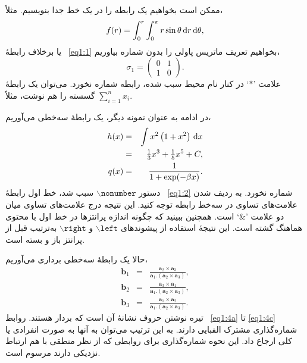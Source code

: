 ممکن است بخواهیم یک رابطه را در یک خط جدا بنویسیم. مثلاً،
\begin{equation}\label{eq1:1}
f(r) = \int_0^r \int_0^\pi r\sin\theta \d r \d\theta,
\end{equation}
یا برخلاف رابطهٔ~
\eqref{eq1:1} 
بخواهیم تعریف ماتریس پاولی را بدون شماره بیاوریم،
\begin{equation*}
\sigma_1 = \left(\begin{array}{ll}
0 & 1\\
1 & 0
\end{array}\right).
\end{equation*}
علامت '$*$` در کنار نام محیط 
سبب شده، رابطه شماره نخورد. می‌توان یک رابطهٔ گسسته را هم نوشت، مثلاً 
$\sum_{i=1}^{n}x_i$.

در ادامه به عنوان نمونه دیگر، یک رابطهٔ سه‌خطی می‌آوریم،
\begin{eqnarray}\label{eq1:2}
h(x) &=& \int x^2\left(1+x^2\right) \d x\nonumber\\
&=& \tfrac{1}{3} x^3 + \tfrac{1}{5} x^5 + C,\\
q(x) &=& \frac{1}{1+\exp(-\beta x)}.\label{eq1:3}
\end{eqnarray}
دستور  
$\backslash\texttt{nonumber}$ 
سبب شد، خط اول رابطهٔ~%
\eqref{eq1:2} 
شماره نخورد. به ردیف شدن علامت‌های تساوی در سه‌خط رابطه توجه کنید. این نتیجه درج علامت‌های تساوی میان دو علامت 
'$\&$` 
است. همچنین ببینید که چگونه اندازه پرانتزها در خط اول با محتوی هماهنگ گشته است. این نتیجهٔ استفاده از پیشوندهای
$\backslash\texttt{left}$ و $\backslash\texttt{right}$ 
به‌ترتیب قبل از پرانتز باز و بسته است.

حالا یک رابطهٔ سه‌خطی برداری می‌آوریم،
\begin{subequations}\label{eq1:4}
\begin{eqnarray}
\mathbf{b}_1 &=& \frac{\mathbf{a}_2 \times \mathbf{a}_3}{\mathbf{a}_1.(\mathbf{a}_2 \times \mathbf{a}_3)},\label{eq1:4a}\\
\mathbf{b}_2 &=& \frac{\mathbf{a}_3 \times \mathbf{a}_1}{\mathbf{a}_1.(\mathbf{a}_2 \times \mathbf{a}_3)},\label{eq1:4b}\\
\mathbf{b}_3 &=& \frac{\mathbf{a}_1 \times \mathbf{a}_2}{\mathbf{a}_1.(\mathbf{a}_2 \times \mathbf{a}_3)}.\label{eq1:4c}
\end{eqnarray}
\end{subequations}
تیره نوشتن حروف نشانه‌ٔ آن است که بردار هستند. روابط~
\eqref{eq1:4a} 
تا 
\eqref{eq1:4c} 
شماره‌گذاری مشترک الفبایی دارند. به این ترتیب می‌توان به آنها به صورت انفرادی یا کلی ارجاع داد. این نحوه شماره‌گذاری برای روابطی که از نظر منطقی با هم ارتباط نزدیکی دارند مرسوم است. 

